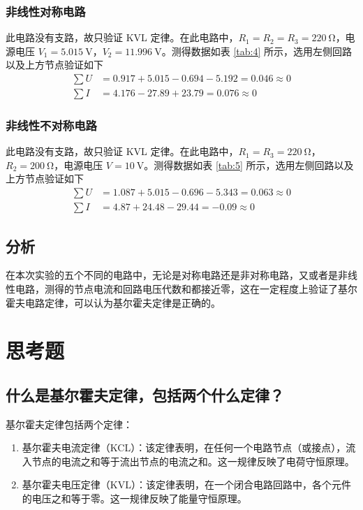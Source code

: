 \documentclass[a4paper,utf8]{article}
\begin{document}
\subsubsection{非线性对称电路}
此电路没有支路，故只验证 KVL 定律。在此电路中，$R_1=R_2=R_3=\SI{220}{\ohm}$，电源电压 $V_1=\SI{5.015}{\V}$，$V_2=\SI{11.996}{\V}$。测得数据如表 \ref{tab:4} 所示，选用左侧回路以及上方节点验证如下
\begin{align*}
    \sum U&= 0.917+5.015-0.694-5.192=0.046\approx 0\\
    \sum I&= 4.176 - 27.89 + 23.79=0.076\approx 0
\end{align*}
\subsubsection{非线性不对称电路}
此电路没有支路，故只验证 KVL 定律。在此电路中，$R_1=R_3=\SI{220}{\ohm}$，$R_2=\SI{200}{\ohm}$，电源电压 $V=\SI{10}{\V}$。测得数据如表 \ref{tab:5} 所示，选用左侧回路以及上方节点验证如下
\begin{align*}
    \sum U&= 1.087+5.015-0.696-5.343=0.063\approx 0\\
    \sum I&= 4.87+24.48-29.44=-0.09\approx 0
\end{align*}
\subsection{分析}
在本次实验的五个不同的电路中，无论是对称电路还是非对称电路，又或者是非线性电路，测得的节点电流和回路电压代数和都接近零，这在一定程度上验证了基尔霍夫电路定律，可以认为基尔霍夫定律是正确的。
\section{思考题}
\subsection{什么是基尔霍夫定律，包括两个什么定律？}
基尔霍夫定律包括两个定律：
\begin{enumerate}
    \item 基尔霍夫电流定律（KCL）：该定律表明，在任何一个电路节点（或接点），流入节点的电流之和等于流出节点的电流之和。这一规律反映了电荷守恒原理。
    \item 基尔霍夫电压定律（KVL）：该定律表明，在一个闭合电路回路中，各个元件的电压之和等于零。这一规律反映了能量守恒原理。
\end{enumerate}
\end{document}
